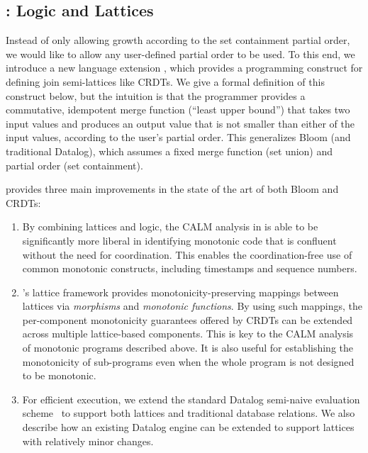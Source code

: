 
\subsection{\lang: Logic and Lattices}
Instead of only allowing growth according to the set containment
partial order, we would like to allow any user-defined partial order to be used.  
To this end, we introduce a new language extension \lang, which provides a programming construct for defining join semi-lattices like CRDTs.
We give a
formal definition of this construct below, but the intuition is that the programmer provides a commutative, idempotent merge function (``least upper bound'')
that takes two input values and produces an output value that is not smaller
than either of the input values, according to the user's partial order. This
generalizes Bloom (and traditional Datalog), which assumes a fixed merge
function (set union) and partial order (set containment).

\lang provides three main improvements in the state of the art of both Bloom and CRDTs:  
\begin{enumerate}
\item By combining lattices and logic, the CALM analysis in \lang is able to be
  significantly more liberal in identifying monotonic code that is confluent
  without the need for coordination.  This enables the coordination-free use of
  common monotonic constructs, including timestamps and sequence numbers.
\item {\lang}'s lattice framework provides monotonicity-preserving mappings
  between lattices via \emph{morphisms} and \emph{monotonic functions}.  By using such mappings, the per-component monotonicity guarantees offered by CRDTs can be extended across multiple lattice-based components.  This is key to the CALM analysis of monotonic \lang programs described above.  It is also useful for establishing the monotonicity of sub-programs even when the whole program is not designed to be monotonic.
\item For efficient execution, we extend the standard Datalog semi-naive
  evaluation scheme~\cite{Balbin1987} to support both lattices and traditional
  database relations. We also describe how an existing Datalog engine can be
  extended to support lattices with relatively minor changes.
\end{enumerate}

